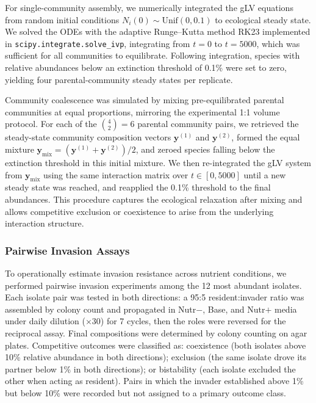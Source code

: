 For single-community assembly, we numerically integrated the gLV equations from random initial conditions $N_i(0) \sim \text{Unif}(0, 0.1)$ to ecological steady state. We solved the ODEs with the adaptive Runge--Kutta method RK23 implemented in \texttt{scipy.integrate.solve\_ivp}, integrating from $t = 0$ to $t = 5000$, which was sufficient for all communities to equilibrate. Following integration, species with relative abundances below an extinction threshold of 0.1\% were set to zero, yielding four parental-community steady states per replicate.

Community coalescence was simulated by mixing pre-equilibrated parental communities at equal proportions, mirroring the experimental 1:1 volume protocol. For each of the $\binom{4}{2} = 6$ parental community pairs, we retrieved the steady-state community composition vectors $\mathbf{y}^{(1)}$ and $\mathbf{y}^{(2)}$, formed the equal mixture $\mathbf{y}_{\text{mix}} = (\mathbf{y}^{(1)} + \mathbf{y}^{(2)})/2$, and zeroed species falling below the extinction threshold in this initial mixture. We then re-integrated the gLV system from $\mathbf{y}_{\text{mix}}$ using the same interaction matrix over $t \in [0, 5000]$ until a new steady state was reached, and reapplied the 0.1\% threshold to the final abundances. This procedure captures the ecological relaxation after mixing and allows competitive exclusion or coexistence to arise from the underlying interaction structure.


\subsubsection*{Pairwise Invasion Assays}
\label{sec:suppl:methods:invasion}

To operationally estimate invasion resistance across nutrient conditions, we performed pairwise invasion experiments among the 12 most abundant isolates. Each isolate pair was tested in both directions: a 95:5 resident:invader ratio was assembled by colony count and propagated in Nutr$-$, Base, and Nutr$+$ media under daily dilution ($\times$30) for 7 cycles, then the roles were reversed for the reciprocal assay. Final compositions were determined by colony counting on agar plates. Competitive outcomes were classified as: coexistence (both isolates above 10\% relative abundance in both directions); exclusion (the same isolate drove its partner below 1\% in both directions); or bistability (each isolate excluded the other when acting as resident). Pairs in which the invader established above 1\% but below 10\% were recorded but not assigned to a primary outcome class. 


